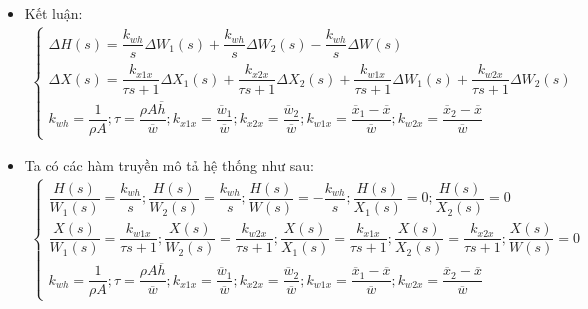 \begin{itemize}
\begin{align*}
            \end{align*}
        \item Kết luận:
            \begin{align*}
                \left\{\begin{array}{l}
                    \Delta H(s) = \dfrac{k_{wh}}{s} \Delta W_1(s) + \dfrac{k_{wh}}{s} \Delta W_2(s) - \dfrac{k_{wh}}{s} \Delta W(s)\\
                    \Delta X(s) = \dfrac{k_{x1x}}{\tau s + 1} \Delta X_1(s) + \dfrac{k_{x2x}}{\tau s + 1} \Delta X_2(s) + \dfrac{k_{w1x}}{\tau s + 1} \Delta W_1(s) + \dfrac{k_{w2x}}{\tau s + 1} \Delta W_2(s)\\
                    k_{wh} = \dfrac{1}{\rho A}; \tau = \dfrac{\rho A \overline{h}}{\overline{w}}; k_{x1x} = \dfrac{\overline{w}_1}{\overline{w}}; k_{x2x} = \dfrac{\overline{w}_2}{\overline{w}}; k_{w1x} = \dfrac{\overline{x}_1 - \overline{x}}{\overline{w}}; k_{w2x} = \dfrac{\overline{x}_2 - \overline{x}}{\overline{w}}
                \end{array}\right.
            \end{align*}

        \item Ta có các hàm truyền mô tả hệ thống như sau:
            \begin{align*}
                \left\{\begin{array}{l}
                    \dfrac{H(s)}{W_1(s)} = \dfrac{k_{wh}}{s}; \dfrac{H(s)}{W_2(s)} = \dfrac{k_{wh}}{s}; \dfrac{H(s)}{W(s)} = -\dfrac{k_{wh}}{s}; \dfrac{H(s)}{X_1(s)} = 0; \dfrac{H(s)}{X_2(s)} = 0\\
                    \dfrac{X(s)}{W_1(s)} = \dfrac{k_{w1x}}{\tau s + 1}; \dfrac{X(s)}{W_2(s)} = \dfrac{k_{w2x}}{\tau s + 1}; \dfrac{X(s)}{X_1(s)} = \dfrac{k_{x1x}}{\tau s + 1}; \dfrac{X(s)}{X_2(s)} = \dfrac{k_{x2x}}{\tau s + 1}; \dfrac{X(s)}{W(s)} = 0 \\
                    k_{wh} = \dfrac{1}{\rho A}; \tau = \dfrac{\rho A \overline{h}}{\overline{w}}; k_{x1x} = \dfrac{\overline{w}_1}{\overline{w}}; k_{x2x} = \dfrac{\overline{w}_2}{\overline{w}}; k_{w1x} = \dfrac{\overline{x}_1 - \overline{x}}{\overline{w}}; k_{w2x} = \dfrac{\overline{x}_2 - \overline{x}}{\overline{w}}
                \end{array}\right.
            \end{align*}


\end{itemize}
